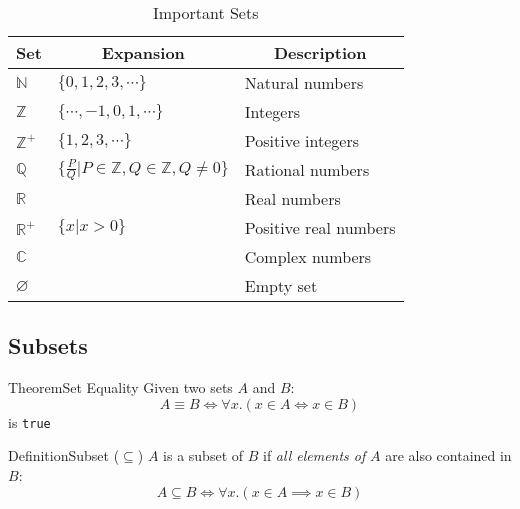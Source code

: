 \documentclass{MathNotes}
\newenvironment{definition}[1]{\begin{RedBox}{Definition}{#1}}{\end{RedBox}}
\newenvironment{theorem}[1]{\begin{GrayBox}{Theorem}{#1}}{\end{GrayBox}}
\begin{document}
\begin{table}[h!]\label{tab:important-sets}
	\centering
	\caption{Important Sets}
	\begin{tabular}{lll}
		\multicolumn{1}{c}{\textbf{Set}}                           &
		\multicolumn{1}{c}{\textbf{Expansion}}                     &
		\multicolumn{1}{c}{\textbf{Description}}                         \\
		\midrule
		$\mathbb{N}$                                               &
		$\{0, 1, 2, 3,\cdots\}$                                    &
		Natural numbers                                                  \\
		$\mathbb{Z}$                                               &
		$\{\cdots,-1,0, 1,\cdots\}$                                &
		Integers                                                         \\
		$\mathbb{Z}^+$                                             &
		$\{1, 2, 3,\cdots\}$                                       &
		Positive integers                                                \\
		$\mathbb{Q}$                                               &
		$\{\frac{P}{Q}\big|P\in\mathbb{Z},Q\in\mathbb{Z},Q\neq0\}$ &
		Rational numbers                                                 \\
		$\mathbb{R}$                                               &   &
		Real numbers                                                     \\
		$\mathbb{R}^+$                                             &
		$\{x\big|x>0\}$                                            &
		Positive real numbers                                            \\
		$\mathbb{C}$                                               &   &
		Complex numbers                                                  \\
		$\varnothing$                                              &   &
		Empty set                                                        \\
	\end{tabular}
\end{table}

\newpage
\subsection{Subsets}
\begin{multicols}{2}
	\begin{theorem}{Set Equality}\label{th:set-equality}
		Given two sets $A$ and $B$:\[A\equiv B\iff\forall x.(x\in A\iff x\in B)\] is \texttt{true}
	\end{theorem}

	\begin{definition}{Subset ($\subseteq$)}
		$A$ is a subset of $B$ if \textit{all elements of} $A$ are also contained in $B$:
		\[A\subseteq B\iff\forall x.(x\in A\implies x\in B)\]
	\end{definition}
\end{multicols}
\end{document}
